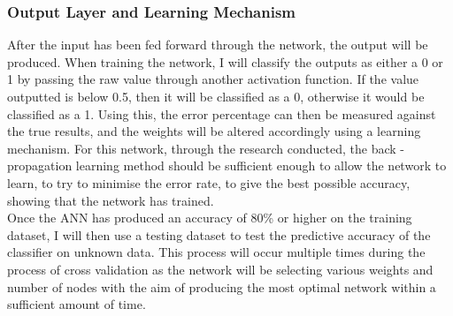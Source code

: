 \documentclass[11pt]{article}
\begin{document}
\subsubsection{Output Layer and Learning Mechanism}
After the input has been fed forward through the network, the output will be produced. When training the network, I will classify the outputs as either a 0 or 1 by passing the raw value through another activation function. If the value outputted is below 0.5, then it will be classified as a 0, otherwise it would be classified as a 1. Using this, the error percentage can then be measured against the true results, and the weights will be altered accordingly using a learning mechanism. For this network, through the research conducted, the back - propagation learning method should be sufficient enough to allow the network to learn, to try to minimise the error rate, to give the best possible accuracy, showing that the network has trained.\\
Once the ANN has produced an accuracy of 80\% or higher on the training dataset, I will then use a testing dataset to test the predictive accuracy of the classifier on unknown data. This process will occur multiple times during the process of cross validation as the network will be selecting various weights and number of nodes with the aim of producing the most optimal network within a sufficient amount of time.
\end{document}
